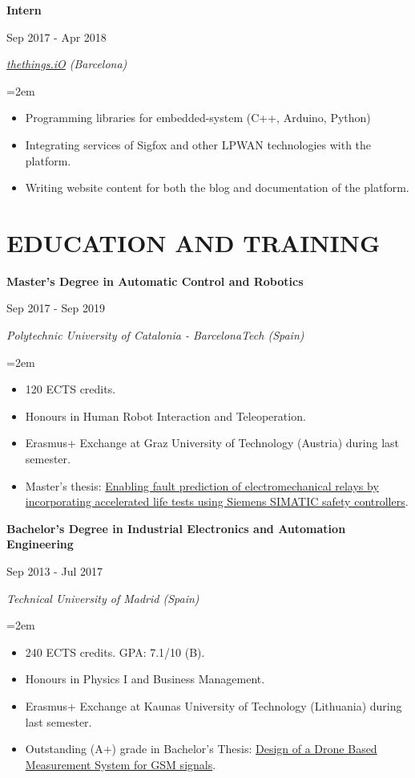 \documentclass[10pt,a4paper,oneside]{book}
\newcommand{\sepspace}{\vspace*{0pt}}		%
\newcommand{\NewPart}[2]{\section*{\uppercase{#1} #2}}
\newcommand{\EducationEntrya}[4]{\noindent\ignorespaces	
		\begin{minipage}[t][][b]{0.8\textwidth} \raggedright{\textbf{#1}} \end{minipage} \hfill 
		\begin{minipage}[t][][b]{0.2\textwidth} \hfill\color{Black}#2\end{minipage} 
		 
		\noindent \textit{#3} \par        %
		\noindent\hangindent=2em\hangafter=0 \small #4 
		\normalsize \par}
\begin{document}
\EducationEntrya{Intern}{Sep 2017 - Apr 2018}{\href{https://thethings.io/}{thethings.iO} (Barcelona)}{\begin{itemize}
\item Programming libraries for embedded-system (C++, Arduino, Python)
\item Integrating services of Sigfox and other LPWAN technologies with the platform.
\item Writing website content for both the blog and  documentation of the platform. 
\end{itemize}}
\sepspace


\NewPart{Education and training}{}

\EducationEntrya{Master’s Degree in Automatic Control and Robotics }{Sep 2017 - Sep 2019}{Polytechnic University of Catalonia - BarcelonaTech (Spain)}{\begin{itemize}
\item 120 ECTS credits. %
\item Honours in Human Robot Interaction and Teleoperation.
\item Erasmus+ Exchange at Graz University of Technology (Austria) during last semester.
\item Master's thesis: \href{https://drive.google.com/file/d/1OEZgRsbPNzGSNii-m0yFRFX4t1LdA2ya/view?usp=sharing}{Enabling fault prediction of electromechanical relays by incorporating accelerated life tests using Siemens SIMATIC safety controllers}.
\end{itemize}}

\sepspace
\EducationEntrya{Bachelor's Degree in Industrial Electronics and Automation Engineering
\\}{Sep 2013 - Jul 2017}{Technical University of Madrid (Spain)}{\begin{itemize} \item 240 ECTS credits. GPA: 7.1/10 (B). \item Honours in Physics I and Business Management. 
\item Erasmus+ Exchange at Kaunas University of Technology (Lithuania) during last semester.
\item Outstanding (A+) grade in Bachelor's Thesis: \href{https://drive.google.com/open?id=1A6GAKAZvCmEC5OA4y8juzTmw9sQMJBd_}{Design of a Drone Based  Measurement System for GSM signals}.\end{itemize}}
\sepspace
\end{document}
